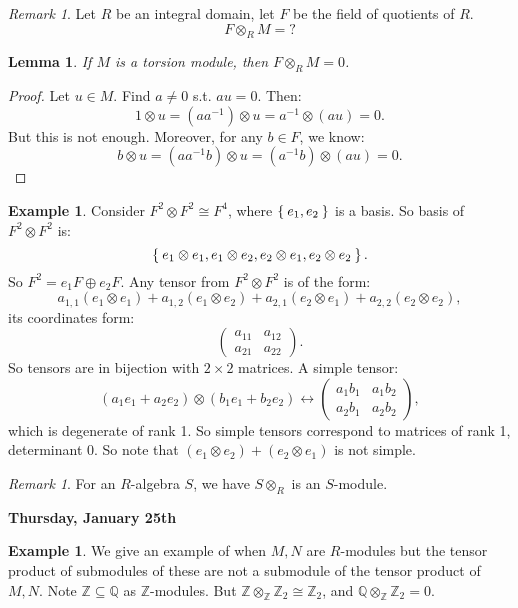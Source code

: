 \documentclass[12pt]{amsbook}
\theoremstyle{plain}
\numberwithin{section}{chapter}
\numberwithin{equation}{chapter}
\newtheorem{lem}[theorem]{Lemma}
\theoremstyle{definition}
\newtheorem{Ex}[theorem]{Example}
\theoremstyle{remark}
\newtheorem{rem}[theorem]{Remark}
\newcommand{\sub}{\subseteq}
\newcommand{\z}{\mathbb{Z}}
\newcommand{\Q}{\mathbb{Q}}
\newcommand{\tens}{\otimes}
\begin{document}
\begin{rem}
Let $R$ be an integral domain, let $F$ be the field of quotients of $R$. 
$$
F \tens_R M = ?
$$
\end{rem}

\begin{lem}
If $M$ is a torsion module, then $F \tens_R M = 0$. 
\end{lem}

\begin{proof}
Let $u \in M$. Find $a \neq 0$ s.t. $au = 0$. Then:
$$
1 \tens u = (aa^{-1})\tens u = a^{-1} \tens (au) = 0.
$$
But this is not enough. Moreover, for any $b \in F$, we know: 
$$
b \tens u = (aa^{-1}b) \tens u = (a^{-1}b) \tens (au) = 0.
$$
\end{proof}

\begin{Ex}
Consider $F^2 \tens F^2 \cong F^4$, where $\Set{e_1,e_2}$ is a basis. So basis of $F^2 \tens F^2$ is:
$$
\Set{e_1 \tens e_1,e_1 \tens e_2,e_2 \tens e_1,e_2 \tens e_2}.
$$
So $F^2 = e_1F \oplus e_2F$. Any tensor from $F^2 \tens F^2$ is of the form:
$$
a_{1,1}(e_1 \tens e_1) + a_{1,2}(e_1 \tens e_2) + a_{2,1}(e_2 \tens e_1) + a_{2,2}(e_2 \tens e_2),
$$
its coordinates form: 
$$
\left( 
\begin{matrix}
a_{11} & a_{12}\\
a_{21} & a_{22}
\end{matrix}
\right).
$$
So tensors are in bijection with $2 \times 2$ matrices. A simple tensor: 
$$
(a_1e_1 + a_2e_2) \tens (b_1e_1 + b_2e_2) \leftrightarrow 
\left(
\begin{matrix}
a_1b_1 & a_1b_2\\
a_2b_1 & a_2 b_2
\end{matrix}
\right),
$$
which is degenerate of rank 1. So simple tensors correspond to matrices of rank 1, determinant 0. So note that $(e_1 \tens e_2) + (e_2 \tens e_1)$ is not simple. 
\end{Ex}

\begin{rem}
For an $R$-algebra $S$, we have $S \tens_R$ is an $S$-module. 
\end{rem}


\textbf{Thursday, January 25th}
\vspace{5mm}
\begin{Ex}
We give an example of when $M,N$ are $R$-modules but the tensor product of submodules of these are not a submodule of the tensor product of $M,N$. Note $\z \sub \Q$ as $\z$-modules. But $\z \tens_\z \z_2 \cong \z_2$, and $\Q \tens_\z \z_2 = 0$. 
\end{Ex}
\end{document}
